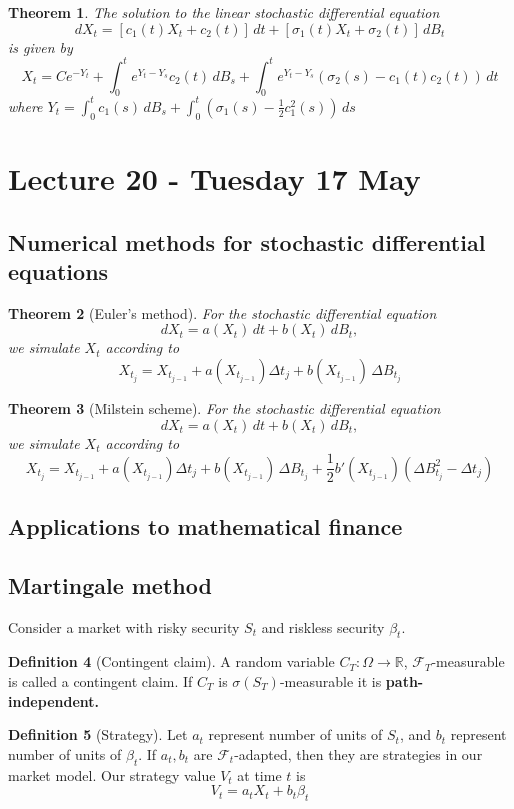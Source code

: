 \documentclass[10pt, oneside, reqno]{amsart}
\theoremstyle{plain}%
\newtheorem{thm}{Theorem}[section]
\theoremstyle{definition}
\newtheorem{defn}[thm]{Definition}
\theoremstyle{remark}
\newcommand{\R}{\mathbb{R}}
\newcommand{\sigf}{\mathcal{F}}
\begin{document}
\begin{thm}
    The solution to the linear stochastic differential equation \[
        dX_t = [ c_1(t) X_t + c_2(t)] \, dt + [ \sigma_1(t) X_t + \sigma_2(t)] \, dB_t
    \] is given by \[
        X_t = Ce^{-Y_t} + \int_0^t e^{Y_t - Y_s} c_2(t) \, dB_s + \int_0^t e^{Y_t - Y_s}(\sigma_2(s) - c_1(t) c_2(t)) \, dt
    \] where $Y_t = \int_0^t c_1(s) \, dB_s + \int_0^t \left(\sigma_1(s) - \frac{1}{2} c_1^2(s) \right) \, ds$
\end{thm}

\section{Lecture 20 - Tuesday 17 May} %
\label{sec:lecture_20_tuesday_17_may}
\subsection{Numerical methods for stochastic differential equations} %
\label{sub:numerical_methods_for_stochastic_differential_equations}

\begin{thm}[Euler's method]
    For the stochastic differential equation \[
        dX_t = a(X_t) \, dt + b(X_t) \, dB_t,
    \] we simulate $X_t$ according to \[
        X_{t_j} = X_{t_{j-1}} + a(X_{t_{j-1}}) \Delta t_j + b(X_{t_{j-1}}) \, \Delta B_{t_j}
    \]
\end{thm}
    
\begin{thm}[Milstein scheme]
    For the stochastic differential equation \[
        dX_t = a(X_t) \, dt + b(X_t) \, dB_t,
    \] we simulate $X_t$ according to \[
        X_{t_j} = X_{t_{j-1}} + a(X_{t_{j-1}}) \Delta t_j + b(X_{t_{j-1}}) \, \Delta B_{t_j} + \frac{1}{2}b'(X_{t_{j-1}})(\Delta B^2_{t_j} - \Delta t_j)
    \]
\end{thm}
\subsection{Applications to mathematical finance} %
\label{sub:applications_to_mathematical_finance}

\subsection{Martingale method} %
\label{sec:martinag}
Consider a market with risky security $S_t$ and riskless security $\beta_t$.  
\begin{defn}[Contingent claim]
    A random variable $C_T : \Omega \rightarrow \R$, $\sigf_T$-measurable is called a contingent claim.  If $C_T$ is $\sigma(S_T)$-measurable it is \textbf{path-independent.}
\end{defn}
\begin{defn}[Strategy]
    Let $a_t$ represent number of units of $S_t$, and $b_t$ represent number of units of $\beta_t$.  If $a_t, b_t$ are $\sigf_t$-adapted, then they are strategies in our market model.  Our strategy value $V_t$ at time $t$ is \[
        V_t = a_t X_t + b_t \beta_t
    \]
\end{defn}
\end{document}

